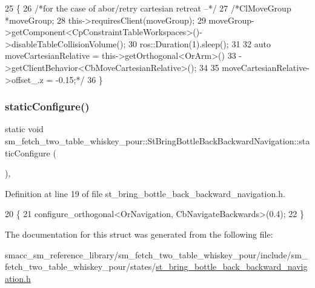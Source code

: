 \begin{DoxyCode}
25         \{
26             \textcolor{comment}{/*for the case of abor/retry cartesian retreat --*/}
27             \textcolor{comment}{/*ClMoveGroup *moveGroup;}
28 \textcolor{comment}{            this->requiresClient(moveGroup);}
29 \textcolor{comment}{            moveGroup->getComponent<CpConstraintTableWorkspaces>()->disableTableCollisionVolume();}
30 \textcolor{comment}{            ros::Duration(1).sleep();}
31 \textcolor{comment}{}
32 \textcolor{comment}{            auto moveCartesianRelative = this->getOrthogonal<OrArm>()}
33 \textcolor{comment}{                                             ->getClientBehavior<CbMoveCartesianRelative>();}
34 \textcolor{comment}{}
35 \textcolor{comment}{            moveCartesianRelative->offset\_.z = -0.15;*/}
36         \}
\end{DoxyCode}
\mbox{\label{structsm__fetch__two__table__whiskey__pour_1_1StBringBottleBackBackwardNavigation_a36ebc8d6b43227ee5363ba654c213aba}} 
\subsubsection{\texorpdfstring{static\+Configure()}{staticConfigure()}}
{\footnotesize\ttfamily static void sm\+\_\+fetch\+\_\+two\+\_\+table\+\_\+whiskey\+\_\+pour\+::\+St\+Bring\+Bottle\+Back\+Backward\+Navigation\+::static\+Configure (\begin{DoxyParamCaption}{ }\end{DoxyParamCaption})\hspace{0.3cm}{\ttfamily [inline]}, {\ttfamily [static]}}



Definition at line 19 of file st\+\_\+bring\+\_\+bottle\+\_\+back\+\_\+backward\+\_\+navigation.\+h.


\begin{DoxyCode}
20         \{
21             configure\_orthogonal<OrNavigation, CbNavigateBackwards>(0.4);
22         \}
\end{DoxyCode}


The documentation for this struct was generated from the following file\+:\begin{DoxyCompactItemize}
\item 
smacc\+\_\+sm\+\_\+reference\+\_\+library/sm\+\_\+fetch\+\_\+two\+\_\+table\+\_\+whiskey\+\_\+pour/include/sm\+\_\+fetch\+\_\+two\+\_\+table\+\_\+whiskey\+\_\+pour/states/\hyperlink{st__bring__bottle__back__backward__navigation_8h}{st\+\_\+bring\+\_\+bottle\+\_\+back\+\_\+backward\+\_\+navigation.\+h}\end{DoxyCompactItemize}
